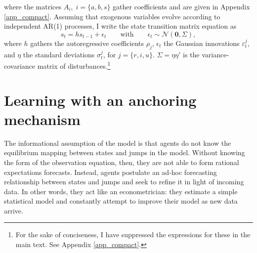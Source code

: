 \documentclass[11pt]{article}
\renewcommand{\[}{\begin{equation}}
\renewcommand{\]}{\end{equation}}
\DeclareMathOperator{\E}{\mathbb{E}}
\begin{document}
where the matrices $A_i, \; i=\{a,b,s\}$ gather coefficients and are given in Appendix \ref{app_compact}. Assuming that exogenous variables evolve according to independent AR(1) processes, I write the state transition matrix equation as
 \begin{equation}
 s_t  = h s_{t-1} + \epsilon_t  \quad \quad \text{with} \quad \quad  \epsilon_t \sim \mathcal{N}(\mathbf{0}, \Sigma) \label{LOM_s},
 \end{equation}
where $h$ gathers the autoregressive coefficients $\rho_j$, $\epsilon_t$ the Gaussian innovations $\varepsilon_t^j$, and $\eta$ the standard deviations $\sigma_t^j$, for $j=\{r,i,u\}$. $\Sigma = \eta \eta'$  is the variance-covariance matrix of disturbances.\footnote{For the sake of conciseness, I have suppressed the expressions for these in the main text. See Appendix \ref{app_compact}.}


\section{Learning with an anchoring mechanism}\label{learning}
The informational assumption of the model is that agents do not know the equilibrium mapping between states and jumps in the model. Without knowing the form of the observation equation, then, they are not able to form rational expectations forecasts.
Instead, agents postulate an ad-hoc forecasting relationship between states and jumps and seek to refine it in light of incoming data. In other words, they act like an econometrician: they estimate a simple statistical model and constantly attempt to improve their model as new data arrive.
\end{document}
